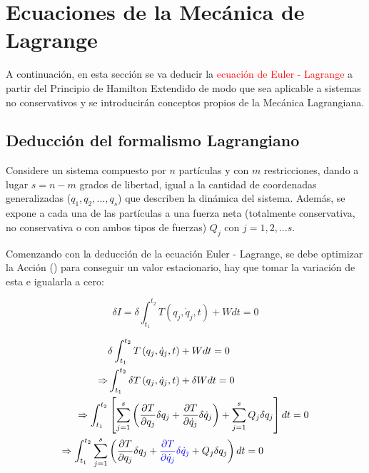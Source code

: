 \documentclass[/home/hernan/Documentos/Apuntes_mecanica_teorica/main.tex]{subfiles}
\begin{document}
    \section{Ecuaciones de la Mecánica de Lagrange}

    A continuación, en esta sección se va deducir la \textcolor{red}{ecuación de Euler - Lagrange}  a partir del Principio de Hamilton Extendido de modo que sea aplicable a sistemas no conservativos y se introducirán conceptos propios de la Mecánica Lagrangiana. \\ 

    \subsection{Deducción del formalismo Lagrangiano}

    Considere un sistema compuesto por $n$ partículas y con $m$ restricciones, dando a lugar $s = n-m$ grados de libertad, igual a la cantidad de coordenadas generalizadas ($q_{1},q_{2},...,q_{s}$) que describen la dinámica del sistema. Además, se expone a cada una de las partículas a una fuerza neta (totalmente conservativa, no conservativa o con ambos tipos de fuerzas) $Q_{j}$ con $j=1,2,...s$.

    Comenzando con la deducción de la ecuación Euler - Lagrange, se debe optimizar la Acción () para conseguir un valor estacionario, hay que tomar la variación de esta e igualarla a cero:
    
    \begin{equation*}
        \delta I = \delta \int_{t_1}^{t_2} T\left(q_{j}, \dot{q}_{j}, t\right) + W dt = 0 
    \end{equation*}

    \begin{align*}
        & \delta \int_{t_1}^{t_2} T\left(q_{j}, \dot{q}_{j}, t\right) + W dt = 0 \\ 
        \Rightarrow & \int_{t_1}^{t_2} \delta T\left(q_{j}, \dot{q}_{j}, t\right) + \delta  W dt = 0 \\ 
        \Rightarrow  \int_{t_1}^{t_2}  & \left[  \sum_{j=1}^{s} \left( \frac{\partial T}{\partial q_{j}}   \delta q_{j} +\frac{\partial T}{\partial \dot{q}_{j}} \delta \dot{q}_{j}  \right) + \sum_{j=1}^{s} Q_{j} \delta q_{j}  \right] dt = 0 \\ 
        \Rightarrow \int_{t_1}^{t_2} \sum_{j=1}^{s} & \left(\frac{\partial T}{\partial q_{j}} \delta q_{j} + \textcolor{blue}{\frac{\partial T}{\partial \dot{q}_{j}} \delta \dot{q}_{j}}   + Q_{j} \delta q_{j} \right) dt = 0 \\ 
    \end{align*}
\end{document}
